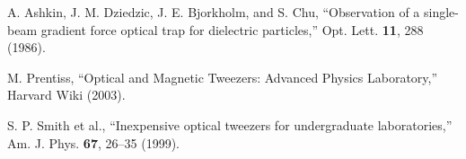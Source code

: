 \documentclass[aps,prb,twocolumn,superscriptaddress,floatfix,longbibliography,citeautoscript]{revtex4-2}
\begin{document}

\begin{thebibliography}{99}

A. Ashkin, J. M. Dziedzic, J. E. Bjorkholm, and S. Chu,
``Observation of a single-beam gradient force optical trap for dielectric particles,''
Opt. Lett. \textbf{11}, 288 (1986).

M. Prentiss, 
``Optical and Magnetic Tweezers: Advanced Physics Laboratory,''
Harvard Wiki (2003).

S. P. Smith et al.,
``Inexpensive optical tweezers for undergraduate laboratories,''
Am. J. Phys. \textbf{67}, 26--35 (1999).


\end{thebibliography}
\end{document}
